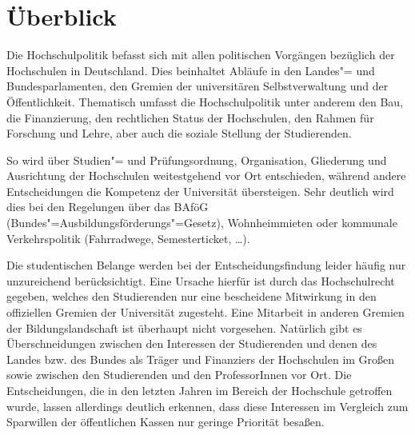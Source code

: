 \section{Überblick}
\label{hopo}

Die Hochschulpolitik befasst sich mit allen politischen Vorgängen
bezüglich der Hochschulen in Deutschland. Dies beinhaltet Abläufe in den
Landes"= und Bundesparlamenten, den Gremien der universitären
Selbstverwaltung und der Öffentlichkeit. Thematisch umfasst die
Hochschulpolitik unter anderem den Bau, die Finanzierung, den rechtlichen
Status der Hochschulen, den Rahmen für Forschung und Lehre, aber auch die
soziale Stellung der Studierenden.

So wird über Studien"= und Prüfungsordnung, Organisation, Gliederung und
Ausrichtung der Hochschulen weitestgehend vor Ort entschieden, während
andere Entscheidungen die Kompetenz der Universität übersteigen. Sehr
deutlich wird dies bei den Regelungen über das BAföG
(Bundes"=Ausbildungsförderungs"=Gesetz), Wohnheimmieten oder kommunale
Verkehrspolitik (Fahrradwege, Semesterticket, \dots).

Die studentischen Belange werden bei der Entscheidungsfindung leider
häufig nur unzureichend berücksichtigt. Eine Ursache hierfür ist durch das
Hochschulrecht gegeben, welches den Studierenden nur eine bescheidene
Mitwirkung in den offiziellen Gremien der Universität zugesteht. Eine
Mitarbeit in anderen Gremien der Bildungslandschaft ist überhaupt nicht
vorgesehen. Natürlich gibt es Überschneidungen zwischen den Interessen der
Studierenden und denen des Landes bzw. des Bundes als Träger und
Finanziers der Hochschulen im Großen sowie zwischen den Studierenden und
den ProfessorInnen vor Ort. Die Entscheidungen, die in den letzten Jahren im
Bereich der Hochschule getroffen wurde, lassen allerdings deutlich
erkennen, dass diese Interessen im Vergleich zum Sparwillen der
öffentlichen Kassen nur geringe Priorität besaßen.


